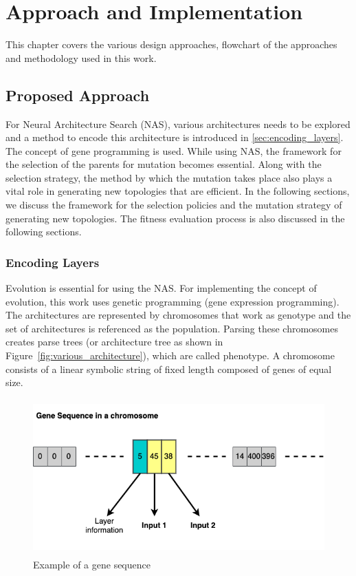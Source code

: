 \chapter{Approach and Implementation}
\label{chap:approach_and_implementation}

This chapter covers the various design approaches, flowchart of the approaches and methodology used in this work.

\section{Proposed Approach}
\label{sec:proposed_approach}
For Neural Architecture Search (NAS), various architectures needs to be explored and a method to encode this architecture is introduced in \autoref{sec:encoding_layers}. The concept of gene programming is used. While using NAS, the framework for the selection of the parents for mutation becomes essential. Along with the selection strategy, the method by which the mutation takes place also plays a vital role in generating new topologies that are efficient. In the following sections, we discuss the framework for the selection policies and the mutation strategy of generating new topologies. The fitness evaluation process is also discussed in the following sections.

\subsection{Encoding Layers}
\label{sec:encoding_layers}

Evolution is essential for using the NAS. For implementing the concept of evolution, this work uses genetic programming (gene expression programming). The architectures are represented by chromosomes that work as genotype and the set of architectures is referenced as the population. Parsing these chromosomes creates parse trees (or architecture tree as shown in Figure~\ref{fig:various_architecture}), which are called phenotype. A chromosome consists of a linear symbolic string of fixed length composed of genes of equal size. 

\begin{figure}[ht]
    \centering
    \includegraphics[width=1.0\linewidth, height=6cm]{BachelorMasterThesis/ApproachAndImplementation/Figures/gene_sequence.png}
    \caption{Example of a gene sequence}
    \label{fig:gene_sequence}
\end{figure}


